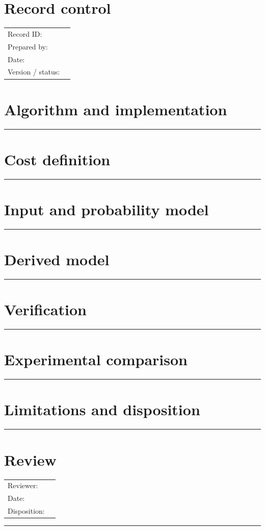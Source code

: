 \documentclass[11pt]{article}
\begin{document}
\makedoctitle
\section{Record control}
\begin{tabularx}{\linewidth}{@{}lX@{}}Record ID: & \hrulefill \\ Prepared by: & \hrulefill \\ Date: & \hrulefill \\ Version / status: & \hrulefill \\\end{tabularx}
\section{Algorithm and implementation}
\vspace{1.75cm}\hrule\vspace{0.35cm}
\section{Cost definition}
\vspace{1.75cm}\hrule\vspace{0.35cm}
\section{Input and probability model}
\vspace{1.75cm}\hrule\vspace{0.35cm}
\section{Derived model}
\vspace{1.75cm}\hrule\vspace{0.35cm}
\section{Verification}
\vspace{1.75cm}\hrule\vspace{0.35cm}
\section{Experimental comparison}
\vspace{1.75cm}\hrule\vspace{0.35cm}
\section{Limitations and disposition}
\vspace{1.75cm}\hrule\vspace{0.35cm}
\section{Review}\begin{tabularx}{\linewidth}{@{}lX@{}}Reviewer: & \hrulefill \\ Date: & \hrulefill \\ Disposition: & \hrulefill \\\end{tabularx}\vspace{0.9cm}\hrule
\end{document}
